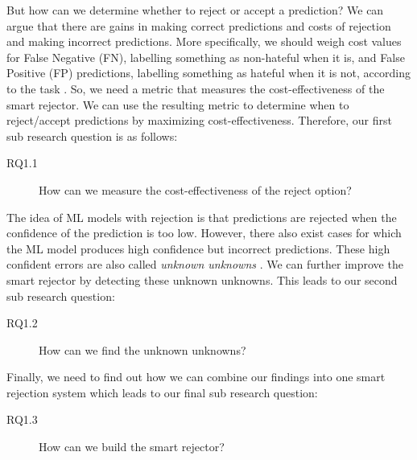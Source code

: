 But how can we determine whether to reject or accept a prediction? We can argue that there are gains in making correct predictions and costs of rejection and making incorrect predictions. More specifically, we should weigh cost values for False Negative (FN), labelling something as non-hateful when it is, and False Positive (FP) predictions, labelling something as hateful when it is not, according to the task \cite{sayin2021science}. So, we need a metric that measures the cost-effectiveness of the smart rejector. We can use the resulting metric to determine when to reject/accept predictions by maximizing cost-effectiveness. Therefore, our first sub research question is as follows:

\begin{description}
	\item[RQ1.1] How can we measure the cost-effectiveness of the reject option?
\end{description}

The idea of ML models with rejection is that predictions are rejected when the confidence of the prediction is too low. However, there also exist cases for which the ML model produces high confidence but incorrect predictions. These high confident errors are also called \textit{unknown unknowns} \cite{liu2020towards}. We can further improve the smart rejector by detecting these unknown unknowns. This leads to our second sub research question:

\begin{description}
	\item[RQ1.2] How can we find the unknown unknowns?
\end{description}

Finally, we need to find out how we can combine our findings into one smart rejection system which leads to our final sub research question:

\begin{description}
	\item[RQ1.3] How can we build the smart rejector?
\end{description}


